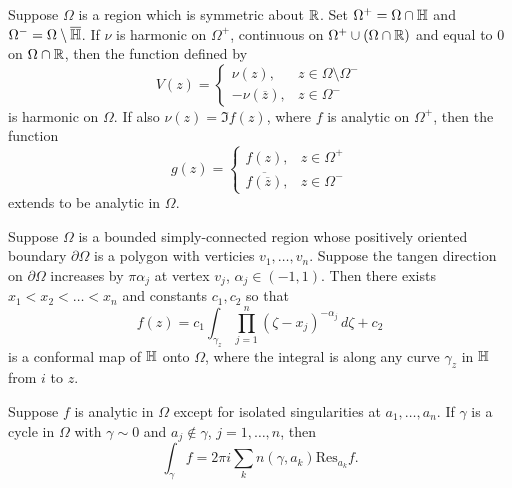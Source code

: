 \documentclass[12pt]{article}
\begin{document}
\begin{theorem}
    Suppose $\Omega$ is a region which is symmetric about $\mathbb{R}$. Set $\Omega^+=\Omega\cap\mathbb{H}$ and $\Omega^-=\Omega\setminus\overline{\mathbb{H}}$. If $\nu$ is harmonic on $\Omega^+$, continuous on $\Omega^+\cup(\Omega\cap\mathbb{R})$ and equal to $0$ on $\Omega\cap\mathbb{R}$, then the function defined by
    \begin{equation*}
        V(z)=\begin{cases}
            \nu(z),&z\in\Omega\setminus\Omega^-\\
            -\nu(\overline{z}),&z\in \Omega^-
        \end{cases}
    \end{equation*}
    is harmonic on $\Omega$. If also $\nu(z)=\Im f(z)$, where $f$ is analytic on $\Omega^+$, then the function
    \begin{equation*}
        g(z)=\begin{cases}
            f(z),&z\in\Omega^+\\
            \overline{f(\overline{z})},&z\in \Omega^-
        \end{cases}
    \end{equation*}
    extends to be analytic in $\Omega$.
\end{theorem}

\begin{theorem}
    Suppose $\Omega$ is a bounded simply-connected region whose positively oriented boundary $\partial\Omega$ is a polygon with verticies $v_1,\dots,v_n$. Suppose the tangen direction on $\partial\Omega$ increases by $\pi\alpha_j$ at vertex $v_j$, $\alpha_j\in(-1,1)$. Then there exists $x_1<x_2<\dots<x_n$ and constants $c_1,c_2$ so that
    \begin{equation*}
        f(z) = c_1\int_{\gamma_z} \prod_{j=1}^n (\zeta-x_j)^{-\alpha_j}\,d\zeta +c_2
    \end{equation*}
    is a conformal map of $\mathbb{H}$ onto $\Omega$, where the integral is along any curve $\gamma_z$ in $\mathbb{H}$ from $i$ to $z$.
\end{theorem}

\begin{theorem}
    Suppose $f$ is analytic in $\Omega$ except for isolated singularities at $a_1,\dots,a_n$. If $\gamma$ is a cycle in $\Omega$ with $\gamma\sim 0$ and $a_j\notin\gamma$, $j=1,\dots,n$, then
    \begin{equation*}
        \int_\gamma f=2\pi i\sum_{k} n(\gamma,a_k)\text{Res}_{a_k} f.
    \end{equation*}
\end{theorem}
\end{document}
